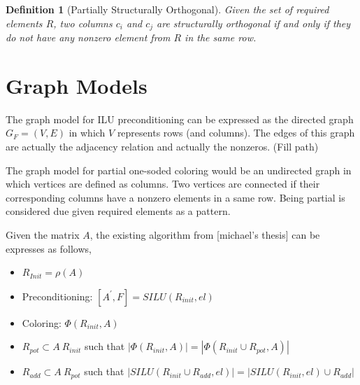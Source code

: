 \documentclass[12pt, oneside]{book}
\newtheorem{definition}{Definition}
\begin{document}
\begin{definition}[Partially Structurally Orthogonal]
Given the set of required elements $R$, two columns $c_i$ and $c_j$ are structurally orthogonal 
if and only if they do not have any nonzero element from $R$ in the same row.
\end{definition}



\section{Graph Models}
The graph model for ILU preconditioning can be expressed as the directed graph $G_F=(V,E)$
in which $V$ represents rows (and columns). The edges of this graph are actually the adjacency relation
and actually the nonzeros. (Fill path)

The graph model for partial one-soded coloring would be an undirected graph in which
vertices are defined as columns. Two vertices are connected if their corresponding 
columns have a nonzero elements in a same row. Being partial is considered due given
required elements as a pattern. 

Given the matrix $A$, the existing algorithm from [michael's thesis] can be expresses as follows,
\begin{itemize}
\item $R_{Init}=\rho(A)$
\item Preconditioning: $[A^{'},F] = SILU(R_{init},el)$
\item Coloring: $\Phi(R_{init},A)$
\item $R_{pot}\subset A\ R_{init}$ such that $|\Phi(R_{init},A)|=|\Phi(R_{init}\cup R_{pot},A)|$
\item $R_{add}\subset A\ R_{pot}$ such that $|SILU(R_{init}\cup R_{add},el)|=|SILU(R_{init},el) \cup R_{add}|$
\end{itemize}
\end{document}
